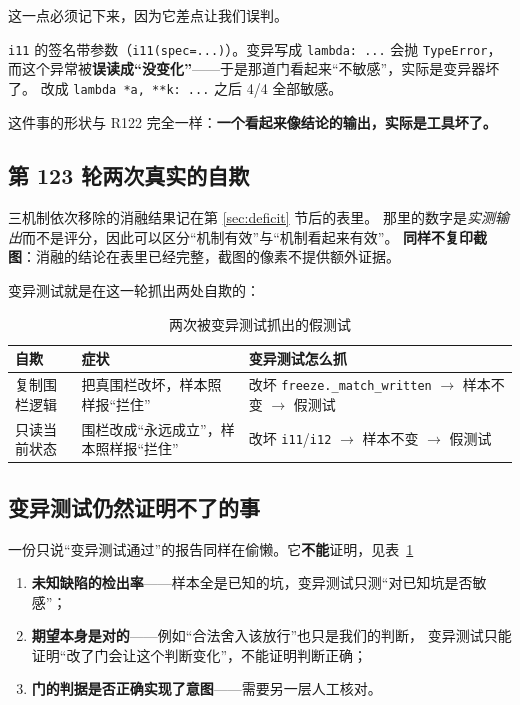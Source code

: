 \documentclass[11pt,a4paper]{article}
\newcommand{\code}[1]{\texttt{#1}}
\begin{document}
这一点必须记下来，因为它差点让我们误判。

\code{i11} 的签名带参数（\code{i11(spec=...)}）。变异写成 \code{lambda: ...} 会抛 \code{TypeError}，
而这个异常被\textbf{误读成“没变化”}——于是那道门看起来“不敏感”，实际是变异器坏了。
改成 \code{lambda *a, **k: ...} 之后 4/4 全部敏感。

这件事的形状与 R122 完全一样：\textbf{一个看起来像结论的输出，实际是工具坏了。}

\subsection{第 123 轮两次真实的自欺}

三机制依次移除的消融结果记在第 \ref{sec:deficit} 节后的表里。
那里的数字是\emph{实测输出}而不是评分，因此可以区分“机制有效”与“机制看起来有效”。
\textbf{同样不复印截图}：消融的结论在表里已经完整，截图的像素不提供额外证据。

变异测试就是在这一轮抓出两处自欺的：

\begin{table}[tbp]\centering\small
\caption{两次被变异测试抓出的假测试}\label{tab:faketest}
\setlength{\tabcolsep}{4pt}
\begin{tabular}{p{3.4cm}p{4.2cm}p{6cm}}
\toprule
自欺 & 症状 & 变异测试怎么抓\\
\midrule
复制围栏逻辑 & 把真围栏改坏，样本照样报“拦住” & 改坏 \code{freeze.\_match\_written} $\to$ 样本不变 $\to$ 假测试\\
只读当前状态 & 围栏改成“永远成立”，样本照样报“拦住” & 改坏 \code{i11}/\code{i12} $\to$ 样本不变 $\to$ 假测试\\
\bottomrule
\end{tabular}
\end{table}

\subsection{变异测试仍然证明不了的事}
一份只说“变异测试通过”的报告同样在偷懒。它\textbf{不能}证明，见表~\ref{tab:faketest}

\begin{enumerate}[leftmargin=1.6em,itemsep=2pt]
\item \textbf{未知缺陷的检出率}——样本全是已知的坑，变异测试只测“对已知坑是否敏感”；
\item \textbf{期望本身是对的}——例如“合法舍入该放行”也只是我们的判断，
  变异测试只能证明“改了门会让这个判断变化”，不能证明判断正确；
\item \textbf{门的判据是否正确实现了意图}——需要另一层人工核对。
\end{enumerate}
\end{document}
